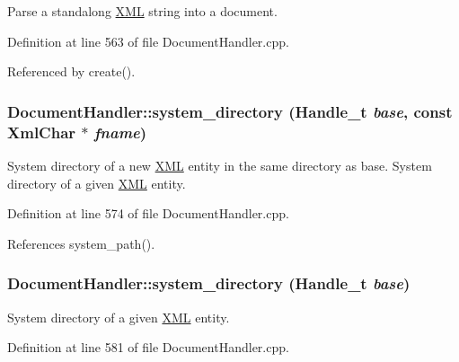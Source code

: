 Parse a standalong \hyperlink{namespace_d_d4hep_1_1_x_m_l}{XML} string into a document. 

Definition at line 563 of file DocumentHandler.cpp.

Referenced by create().\hypertarget{class_d_d4hep_1_1_x_m_l_1_1_document_handler_afcb87f1aa5a2dbd771990d4e2e36a3ed}{
\subsubsection[{system\_\-directory}]{ DocumentHandler::system\_\-directory ({\bf Handle\_\-t} {\em base}, \/  const {\bf XmlChar} $\ast$ {\em fname})}}
\label{class_d_d4hep_1_1_x_m_l_1_1_document_handler_afcb87f1aa5a2dbd771990d4e2e36a3ed}


System directory of a new \hyperlink{namespace_d_d4hep_1_1_x_m_l}{XML} entity in the same directory as base. System directory of a given \hyperlink{namespace_d_d4hep_1_1_x_m_l}{XML} entity. 

Definition at line 574 of file DocumentHandler.cpp.

References system\_\-path().\hypertarget{class_d_d4hep_1_1_x_m_l_1_1_document_handler_aac81a43d656b9c4149d6e40642abf0fb}{
\subsubsection[{system\_\-directory}]{ DocumentHandler::system\_\-directory ({\bf Handle\_\-t} {\em base})}}
\label{class_d_d4hep_1_1_x_m_l_1_1_document_handler_aac81a43d656b9c4149d6e40642abf0fb}


System directory of a given \hyperlink{namespace_d_d4hep_1_1_x_m_l}{XML} entity. 

Definition at line 581 of file DocumentHandler.cpp.

